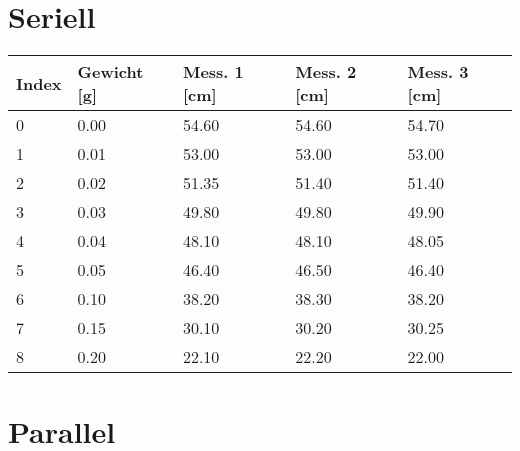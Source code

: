 \documentclass[../main.tex]{subfiles} %
\begin{document}
\section{Seriell}\label{sec:seriell}

\begin{center}
    \begin{tabular}{ |l|l|l|l|l| } \hline\rowcolor{Gray!50}
        Index & Gewicht [g] & Mess. 1 [cm] & Mess. 2 [cm] & Mess. 3 [cm] \\\toprule\hline
        0     & 0.00        & 54.60        & 54.60        & 54.70        \\\hline
        1     & 0.01        & 53.00        & 53.00        & 53.00        \\\hline
        2     & 0.02        & 51.35        & 51.40        & 51.40        \\\hline
        3     & 0.03        & 49.80        & 49.80        & 49.90        \\\hline
        4     & 0.04        & 48.10        & 48.10        & 48.05        \\\hline
        5     & 0.05        & 46.40        & 46.50        & 46.40        \\\hline
        6     & 0.10        & 38.20        & 38.30        & 38.20        \\\hline
        7     & 0.15        & 30.10        & 30.20        & 30.25        \\\hline
        8     & 0.20        & 22.10        & 22.20        & 22.00        \\\hline
    \end{tabular}
\end{center}

\section{Parallel}\label{sec:parallel}
\end{document}
